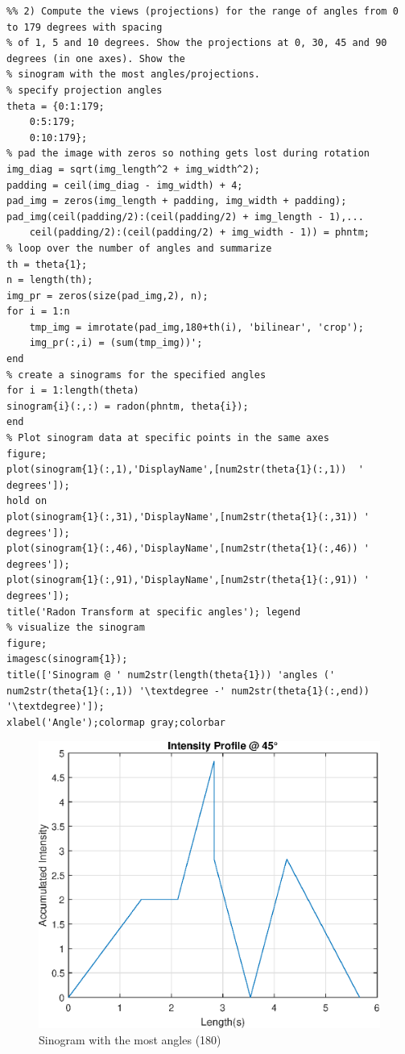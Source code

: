 \begin{lstlisting}
%% 2) Compute the views (projections) for the range of angles from 0 to 179 degrees with spacing
% of 1, 5 and 10 degrees. Show the projections at 0, 30, 45 and 90 degrees (in one axes). Show the
% sinogram with the most angles/projections.
% specify projection angles
theta = {0:1:179;
    0:5:179;
    0:10:179}; 
% pad the image with zeros so nothing gets lost during rotation
img_diag = sqrt(img_length^2 + img_width^2);
padding = ceil(img_diag - img_width) + 4;
pad_img = zeros(img_length + padding, img_width + padding);
pad_img(ceil(padding/2):(ceil(padding/2) + img_length - 1),...
    ceil(padding/2):(ceil(padding/2) + img_width - 1)) = phntm;
% loop over the number of angles and summarize
th = theta{1};
n = length(th);
img_pr = zeros(size(pad_img,2), n);
for i = 1:n
    tmp_img = imrotate(pad_img,180+th(i), 'bilinear', 'crop');
    img_pr(:,i) = (sum(tmp_img))';
end
% create a sinograms for the specified angles
for i = 1:length(theta)
sinogram{i}(:,:) = radon(phntm, theta{i}); 
end
% Plot sinogram data at specific points in the same axes
figure;
plot(sinogram{1}(:,1),'DisplayName',[num2str(theta{1}(:,1))  ' degrees']);
hold on
plot(sinogram{1}(:,31),'DisplayName',[num2str(theta{1}(:,31)) ' degrees']);
plot(sinogram{1}(:,46),'DisplayName',[num2str(theta{1}(:,46)) ' degrees']);
plot(sinogram{1}(:,91),'DisplayName',[num2str(theta{1}(:,91)) ' degrees']);
title('Radon Transform at specific angles'); legend
% visualize the sinogram
figure; 
imagesc(sinogram{1}); 
title(['Sinogram @ ' num2str(length(theta{1})) 'angles (' num2str(theta{1}(:,1)) '\textdegree -' num2str(theta{1}(:,end)) '\textdegree)']);
xlabel('Angle');colormap gray;colorbar
\end{lstlisting}

\begin{figure}[htb!]
    \centering
    \includegraphics[width=.6\linewidth]{homework1/img/8.eps}
    \caption{Sinogram with the most angles (180)}
    \label{fig:sinogram:compl_angles}
\end{figure}

